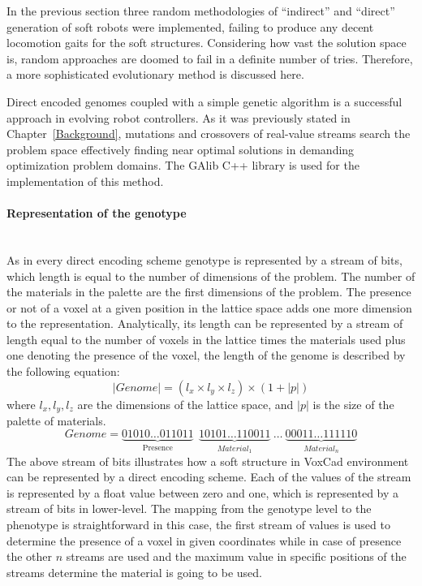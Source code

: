 In the previous section three random methodologies of ``indirect'' and ``direct'' generation of soft robots were implemented, failing to produce any decent locomotion gaits for the soft structures. Considering how vast the solution space is, random approaches are doomed to fail in a definite number of tries. Therefore, a more sophisticated evolutionary method is discussed here.

Direct encoded genomes coupled with a simple genetic algorithm is a successful approach in evolving robot controllers. As it was previously stated in Chapter~\ref{Background}, mutations and crossovers of real-value streams search the problem space effectively finding near optimal solutions in demanding optimization problem domains. The GAlib C++ library \citep{wall1996galib} is used for the implementation of this method.

\paragraph*{Representation of the genotype}~\\
As in every direct encoding scheme genotype is represented by a stream of bits, which length is equal to the number of dimensions of the problem. The number of the materials in the palette are the first dimensions of the problem. The presence or not of a voxel at a given position in the lattice space adds one more dimension to the representation. Analytically, its length can be represented by a stream of length equal to the number of voxels in the lattice times the materials used plus one denoting the presence of the voxel, the length of the genome is described by the following equation:
\begin{equation}
\label{lengthDirect}
| Genome | = (l_x \times l_y \times l_z ) \times (1 + |p|)
\end{equation}
where $l_x, l_y, l_z$ are the dimensions of the lattice space, and $|p|$ is the size of the palette of materials.
\begin{equation*}
Genome = \underbrace{01010\ldots011011}_\text{Presence}\ \    \underbrace{10101\ldots110011}_{Material_1} \   \ldots\  \underbrace{00011\ldots111110}_{Material_n}
\end{equation*}
The above stream of bits illustrates how a soft structure in VoxCad environment can be represented by a direct encoding scheme. Each of the values of the stream is represented by a float value between zero and one, which is represented by a stream of bits in lower-level. The mapping from the genotype level to the phenotype is straightforward in this case, the first stream of values is used to determine the presence of a voxel in given coordinates while in case of presence the other $n$ streams are used and the maximum value in specific positions of the streams determine the material is going to be used.

